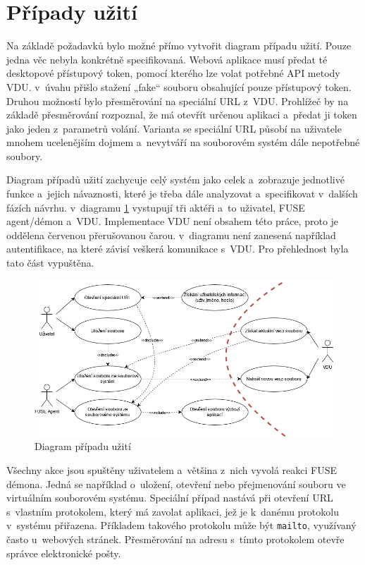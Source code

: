 \section{Případy užití}

Na základě požadavků bylo možné přímo vytvořit diagram případu užití. Pouze jedna věc nebyla konkrétně specifikovaná. Webová aplikace musí předat té desktopové 
přístupový token, pomocí kterého lze volat potřebné API metody VDU. v úvahu přišlo stažení „fake“ souboru obsahující pouze přístupový token. Druhou možností bylo
přesměrování na speciální URL z VDU. Prohlížeč by na základě přesměrování rozpoznal, že má otevřít určenou aplikaci a předat ji token jako jeden z parametrů
volání. Varianta se speciální URL působí na uživatele mnohem ucelenějším dojmem a nevytváří na souborovém systém dále nepotřebné soubory.

Diagram případů užití zachycuje celý systém jako celek a zobrazuje jednotlivé funkce a jejich návaznosti, které je třeba dále analyzovat a specifikovat v dalších
fázích návrhu. v diagramu \ref{fig:use_case} vystupují tři aktéři a to uživatel, FUSE agent/démon a VDU. Implementace VDU není obsahem této práce, proto je oddělena červenou
přerušovanou čarou. v diagramu není zanesená například autentifikace, na které závisí veškerá komunikace s VDU. Pro přehlednost byla tato část vypuštěna.

\begin{figure}[h]
    \centering    
    \includegraphics[width=1\linewidth]{other-fig/use_case_diagram.png}
    \caption{Diagram případu užití}
    \label{fig:use_case}
\end{figure}


Všechny akce jsou spuštěny uživatelem a většina z nich vyvolá reakci FUSE démona. Jedná se například o uložení, otevření nebo přejmenování souboru ve virtuálním souborovém
systému. Speciální případ nastává při otevření URL s vlastním protokolem, který má zavolat aplikaci, jež je k danému protokolu v systému přiřazena. Příkladem takového
protokolu může být \texttt{mailto}, využívaný často u webových stránek. Přesměrování na adresu s tímto protokolem otevře správce elektronické pošty. 

